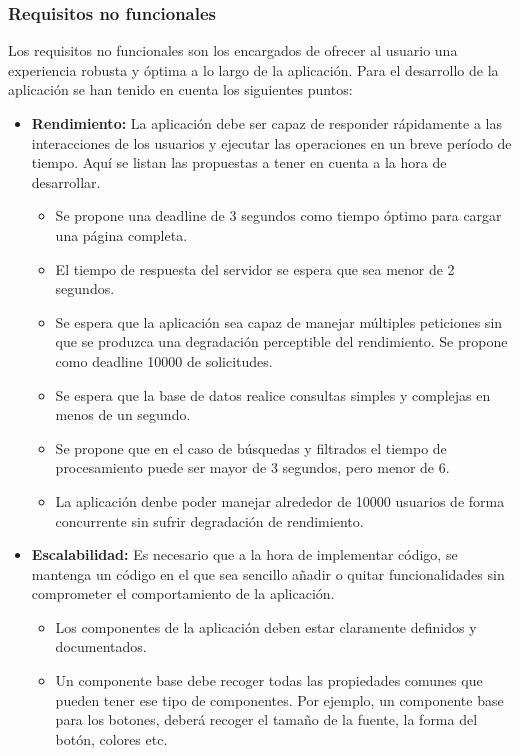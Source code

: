 \documentclass[a4paper, 12pt]{article}
\begin{document}
\subsubsection{Requisitos no funcionales}

Los requisitos no funcionales son los encargados de ofrecer al usuario una experiencia robusta y óptima a lo largo de la aplicación. Para el desarrollo de la aplicación se han tenido en cuenta los siguientes puntos:

\begin{itemize}
	\item \textbf{Rendimiento:} La aplicación debe ser capaz de responder rápidamente a las interacciones de los usuarios y ejecutar las operaciones en un breve período de tiempo. Aquí se listan las propuestas a tener en cuenta a la hora de desarrollar.
		\begin{itemize}
			\item Se propone una deadline de 3 segundos como tiempo óptimo para cargar una página completa.
			\item El tiempo de respuesta del servidor se espera que sea menor de 2 segundos.
			\item Se espera que la aplicación sea capaz de manejar múltiples peticiones sin que se produzca una degradación perceptible del rendimiento. Se propone como deadline 10000 de solicitudes.
			\item Se espera que la base de datos realice consultas simples y complejas en menos de un segundo.
			\item Se propone que en el caso de búsquedas y filtrados el tiempo de procesamiento puede ser mayor de 3 segundos, pero menor de 6.
			\item La aplicación denbe poder manejar alrededor de 10000 usuarios de forma concurrente sin sufrir degradación de rendimiento.
		\end{itemize}
	\item \textbf{Escalabilidad:} Es necesario que a la hora de implementar código, se mantenga un código en el que sea sencillo añadir o quitar funcionalidades sin comprometer el comportamiento de la aplicación.
		\begin{itemize}
			\item Los componentes de la aplicación deben estar claramente definidos y documentados.
			\item Un componente base debe recoger todas las propiedades comunes que pueden tener ese tipo de componentes. Por ejemplo, un componente base para los botones, deberá recoger el tamaño de la fuente, la forma del botón, colores etc.

\end{itemize}
\end{itemize}
\end{document}
